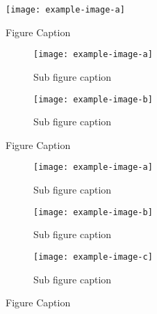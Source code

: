 \begin{figure}
    \centering
    \texttt{[image: example-image-a]}
    \caption{Figure Caption}
\end{figure}


\begin{figure}
    \centering
    \begin{subfigure}[b]{0.49\textwidth}
        \centering
        \texttt{[image: example-image-a]}
        \caption{Sub figure caption}
    \end{subfigure}
    \hfill
    \begin{subfigure}[b]{0.49\textwidth}
        \centering
        \texttt{[image: example-image-b]}
        \caption{Sub figure caption}
    \end{subfigure}
    \caption{Figure Caption}
\end{figure}


\begin{figure}
     \centering
     \begin{subfigure}[b]{0.32\textwidth}
         \centering
         \texttt{[image: example-image-a]}
         \caption{Sub figure caption}
     \end{subfigure}
     \hfill
     \begin{subfigure}[b]{0.32\textwidth}
         \centering
         \texttt{[image: example-image-b]}
         \caption{Sub figure caption}
     \end{subfigure}
     \hfill
     \begin{subfigure}[b]{0.32\textwidth}
         \centering
         \texttt{[image: example-image-c]}
         \caption{Sub figure caption}
     \end{subfigure}
     \caption{Figure Caption}
\end{figure}


